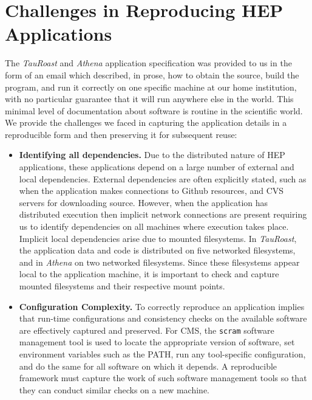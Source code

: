 \section{Challenges in Reproducing HEP Applications}

The \emph{TauRoast} and \emph{Athena} application specification was provided to us in the form of an
email which described, in prose, how to obtain the source,
build the program, and run it correctly on one specific
machine at our home institution, with no particular guarantee that
it will run anywhere else in the world. This minimal level of documentation about software is routine in the scientific world. 
We provide the challenges we faced in capturing the application details in a reproducible form and then preserving it for subsequent reuse:

\begin{itemize}

\item {\bf Identifying all dependencies.}  Due to the distributed nature of HEP applications, these applications depend on a large number of external and local dependencies.
External dependencies are often explicitly stated, such as when the application makes connections to Github resources, and CVS servers for downloading source. 
However, when the application has distributed execution then implicit network connections are present requiring us to identify dependencies on all machines where execution takes place. 
Implicit local dependencies arise due to mounted filesystems. In \emph{TauRoast}, the application data and code is distributed on five networked filesystems, and in \emph{Athena} on two networked filesystems. 
Since these filesystems appear local to the application machine, it is important to check and capture mounted filesystems and their respective mount points. 

\item {\bf Configuration Complexity.} To correctly reproduce an application implies that run-time configurations and consistency checks on the available software are effectively captured and preserved. 
For CMS,  the {\tt scram} software management tool is used to locate
the appropriate version of software,  set environment variables such as the PATH, run any
tool-specific configuration, and do the same for all software on which it depends. A reproducible framework must capture the work of such software management tools so that they can conduct similar
checks on a new machine. 


\end{itemize}
